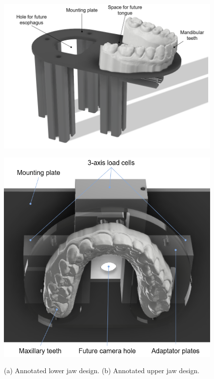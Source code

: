 \begin{figure}[H]
\centering
\begin{minipage}{.5\textwidth}
  \centering
  \includegraphics[width=\textwidth]{figures/lower_jaw_annotated.drawio.png}
  \subcaption{}
  \label{fig:lower_jaw}
\end{minipage}
\begin{minipage}{.4\textwidth}
  \centering
  \includegraphics[width=\textwidth]{figures/upper_jaw_annotated.drawio.png}
  \subcaption{}
  \label{fig:upper_jaw}
\end{minipage}
\caption{(a) Annotated lower jaw design. (b) Annotated upper jaw design. }
\label{fig:jaws}
\end{figure}

